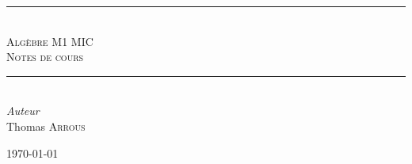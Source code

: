 \documentclass{article}
\begin{document}
	\begin{titlepage}
		\newcommand{\HRule}{\rule{\linewidth}{0.5mm}}
		\center
		
		\HRule\\[0.4cm]
		
		\textsc{\Large Algèbre M1 MIC}\\[0.5cm]
		\textsc{\large Notes de cours}\\[0.5cm]
		
		\HRule\\[1.5cm]
		
		{\large\textit{Auteur}}\\
		Thomas \textsc{Arrous}
		
		
		\vfill\vfill\vfill
		
		{\large\today}
		
		\vfill
		
	\end{titlepage}
	
	\tableofcontents
	\newpage

	
\end{document}
